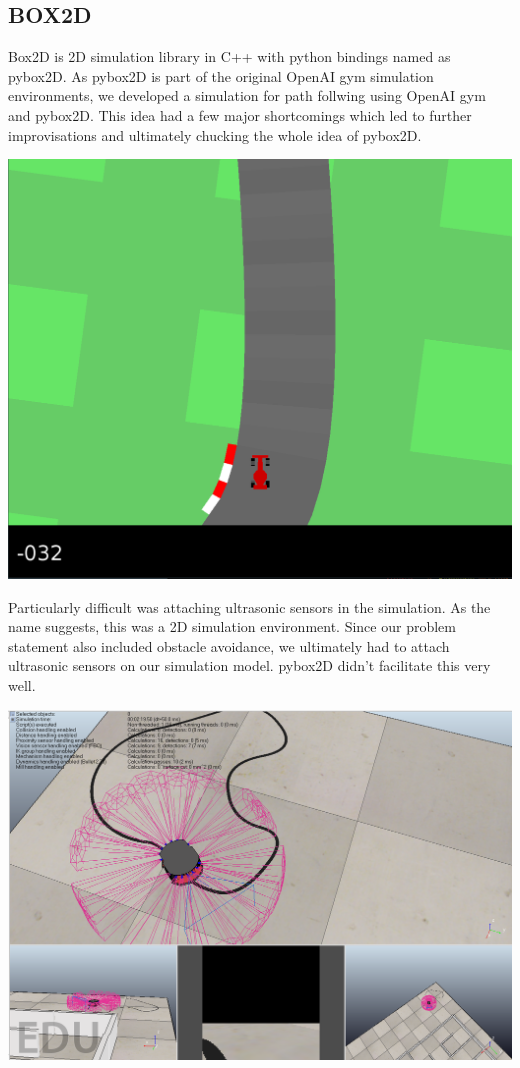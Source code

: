 \documentclass[12pt]{extreport}
\begin{document}
\subsection{BOX2D}
Box2D is 2D simulation library in C++ with python bindings named as pybox2D. As pybox2D is part of the original OpenAI gym simulation environments, we developed a simulation for path follwing using OpenAI gym and pybox2D. This idea had a few major shortcomings which led to further improvisations and ultimately chucking the whole idea of pybox2D.

\begin{center}
    \includegraphics[width=0.8\linewidth]{1.png}
\end{center}


Particularly difficult was attaching ultrasonic sensors in the simulation. As the name suggests, this was a 2D simulation environment. Since our problem statement also included obstacle avoidance, we ultimately had to attach ultrasonic sensors on our simulation model. pybox2D didn't facilitate this very well.

\begin{center}
    \includegraphics[width=0.8\linewidth]{2.png}
\end{center}
\end{document}

